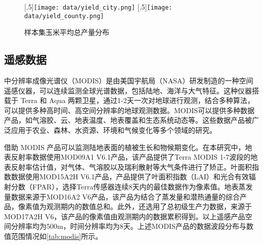 \begin{figure}
  \centering
  \subcaptionbox{\label{fig:yield_city}}[.5\linewidth]{\texttt{[image: data/yield\_city.png]}}\hfill
  \subcaptionbox{\label{fig:yield_county}}[.5\linewidth]{\texttt{[image: data/yield\_county.png]}}\hfill
  \caption{样本集玉米平均总产量分布}
\end{figure}

\subsection{遥感数据}
\par 中分辨率成像光谱仪（MODIS）是由美国宇航局（NASA）研发制造的一种空间遥感仪器，可以连续监测全球光谱数据，包括陆地、海洋与大气特征。这种仪器搭载于 Terra 和 Aqua 两颗卫星，通过1-2天一次对地球进行观测，结合多种算法，可以提供多种高时间、高空间分辨率的地球观测数据。MODIS可以提供多种数据产品，如气溶胶、云、地表温度、地表覆盖和生态系统动态等。这些数据产品被广泛应用于农业、森林、水资源、环境和气候变化等多个领域的研究。

\par 借助 MODIS 产品可以监测陆地表面的植被生长和物候期变化。在本研究中，地表反射率数据使用MOD09A1 V6.1产品，该产品提供了Terra MODIS 1-7波段的地表反射率估计值，对气体、气溶胶以及瑞利散射等大气条件进行了矫正。叶面积指数数据使用MOD15A2H V6.1产品，产品提供了叶面积指数（LAI）和光合有效辐射分数（FPAR），选择Terra传感器连续8天内的最佳数据作为像素值。地表蒸发量数据来源于MOD16A2 V6产品，该产品为结合了蒸发量和潜热通量的综合产品，像素值为观测期内的数值总和。此外，还选用了总初级生产力数据，来源于MOD17A2H V6，该产品的像素值由观测期内的数据累积得到。以上遥感产品空间分辨率均为500m，时间分辨率均为8天。上述MODIS产品的数据波段分布与数值范围情况如\autoref{tab:modis}所示。

